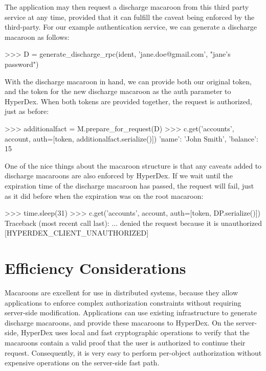The application may then request a discharge macaroon from this third party
service at any time, provided that it can fulfill the caveat being enforced
by the third-party. For our example
authentication service, we can generate a discharge macaroon as follows:

\begin{pythoncode}
>>> D = generate_discharge_rpc(ident, 'jane.doe@gmail.com', "jane's password")
\end{pythoncode}

With the discharge macaroon in hand, we can provide both our original token, and
the token for the new discharge macaroon as the auth parameter to HyperDex.
When both tokens are provided together, the request is authorized, just as
before:

\begin{pythoncode}
>>> additionalfact = M.prepare_for_request(D)
>>> c.get('accounts', account, auth=[token, additionalfact.serialize()])
{'name': 'John Smith', 'balance': 15}
\end{pythoncode}

One of the nice things about the macaroon structure is that any caveats added to
discharge macaroons are also enforced by HyperDex.  If we wait until the
expiration time of the discharge macaroon has passed, the request will fail,
just as it did before when the expiration was on the root macaroon:

\begin{pythoncode}
>>> time.sleep(31)
>>> c.get('accounts', account, auth=[token, DP.serialize()])
Traceback (most recent call last):
... denied the request because it is unauthorized [HYPERDEX_CLIENT_UNAUTHORIZED]
\end{pythoncode}

\section{Efficiency Considerations}

Macaroons are excellent for use in distributed systems, because
they allow applications to enforce complex authorization constraints without
requiring server-side modification.  Applications can use existing infrastructure to
generate discharge macaroons, and provide these macaroons to HyperDex.  On the
server-side, HyperDex uses local and fast cryptographic operations to verify
that the macaroons contain a valid proof that the user is authorized to continue
their request.  Consequently, it is very easy to perform per-object
authorization without expensive operations on the server-side fast path.

